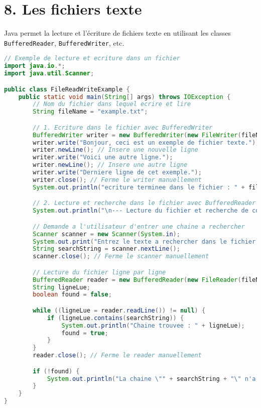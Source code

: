 \documentclass{article}
\begin{document}
\section*{8. Les fichiers texte}
Java permet la lecture et l'écriture de fichiers texte en utilisant les classes \texttt{BufferedReader}, \texttt{BufferedWriter}, etc.
\begin{lstlisting}[language=Java]
// Exemple de lecture et ecriture dans un fichier
import java.io.*;
import java.util.Scanner;

public class FileReadWriteExample {
    public static void main(String[] args) throws IOException {
        // Nom du fichier dans lequel ecrire et lire
        String fileName = "example.txt";

        // 1. Ecriture dans le fichier avec BufferedWriter
        BufferedWriter writer = new BufferedWriter(new FileWriter(fileName));
        writer.write("Bonjour, ceci est un exemple de fichier texte.");
        writer.newLine(); // Insere une nouvelle ligne
        writer.write("Voici une autre ligne.");
        writer.newLine(); // Insere une autre ligne
        writer.write("Derniere ligne de cet exemple.");
        writer.close(); // Ferme le writer manuellement
        System.out.println("ecriture terminee dans le fichier : " + fileName);

        // 2. Lecture et recherche dans le fichier avec BufferedReader
        System.out.println("\n--- Lecture du fichier et recherche de contenu ---");

        // Demande a l'utilisateur d'entrer une chaine a rechercher
        Scanner scanner = new Scanner(System.in);
        System.out.print("Entrez le texte a rechercher dans le fichier : ");
        String searchString = scanner.nextLine();
        scanner.close(); // Ferme le scanner manuellement

        // Lecture du fichier ligne par ligne
        BufferedReader reader = new BufferedReader(new FileReader(fileName));
        String ligneLue;
        boolean found = false;

        while ((ligneLue = reader.readLine()) != null) {
            if (ligneLue.contains(searchString)) {
                System.out.println("Chaine trouvee : " + ligneLue);
                found = true;
            }
        }
        reader.close(); // Ferme le reader manuellement

        if (!found) {
            System.out.println("La chaine \"" + searchString + "\" n'a pas ete trouvee dans le fichier.");
        }
    }
}
\end{lstlisting}
\end{document}

